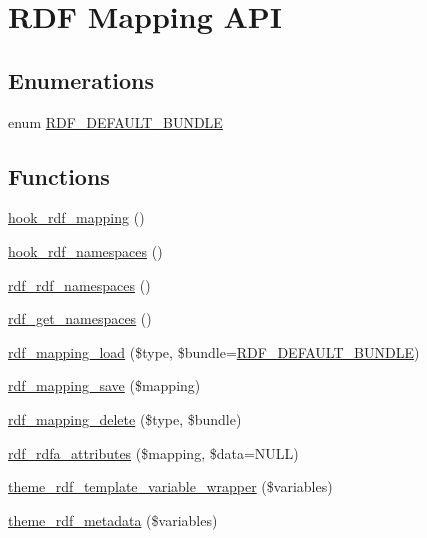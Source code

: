 \hypertarget{group__rdf}{
\section{RDF Mapping API}
\label{group__rdf}
}
\subsection*{Enumerations}
\begin{DoxyCompactItemize}
\item 
enum \hyperlink{group__rdf_ga4f749985c55ac04563d6446524062ac9}{RDF\_\-DEFAULT\_\-BUNDLE} 
\end{DoxyCompactItemize}
\subsection*{Functions}
\begin{DoxyCompactItemize}
\item 
\hyperlink{group__rdf_gae3e7f047bdcb9309b323e2af09966765}{hook\_\-rdf\_\-mapping} ()
\item 
\hyperlink{group__rdf_ga32e59c5e172304a5f49ec7d76ee6bf3b}{hook\_\-rdf\_\-namespaces} ()
\item 
\hyperlink{group__rdf_gaed65d375e129af058947c2d614eb1d3c}{rdf\_\-rdf\_\-namespaces} ()
\item 
\hyperlink{group__rdf_ga395ff70b78c0363ca9ce631b3d15e774}{rdf\_\-get\_\-namespaces} ()
\item 
\hyperlink{group__rdf_ga130340d3ee5b36d5f7da31160b9460ac}{rdf\_\-mapping\_\-load} (\$type, \$bundle=\hyperlink{group__rdf_ga4f749985c55ac04563d6446524062ac9}{RDF\_\-DEFAULT\_\-BUNDLE})
\item 
\hyperlink{group__rdf_ga1e628638b2684b9a5ebc0847066d9131}{rdf\_\-mapping\_\-save} (\$mapping)
\item 
\hyperlink{group__rdf_ga59c3470135f39d1b607e03a0aa774470}{rdf\_\-mapping\_\-delete} (\$type, \$bundle)
\item 
\hyperlink{group__rdf_ga9b02589c8277c732de8c035d5a606de9}{rdf\_\-rdfa\_\-attributes} (\$mapping, \$data=NULL)
\item 
\hyperlink{group__rdf_ga3bb0346c634262f7b193957cc26d38ca}{theme\_\-rdf\_\-template\_\-variable\_\-wrapper} (\$variables)
\item 
\hyperlink{group__rdf_ga74f92e91794fd4f2fcb9abfd777a5955}{theme\_\-rdf\_\-metadata} (\$variables)
\end{DoxyCompactItemize}


